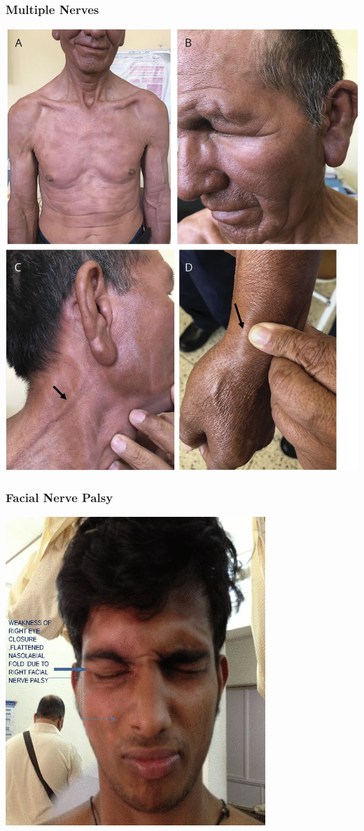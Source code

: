 \documentclass{beamer}
\begin{document}
	\begin{frame}
		\frametitle{Multiple Nerves}
		\centering
		\includegraphics[height=0.8\textheight,keepaspectratio]{hansen's-overall.jpg}
	\end{frame}
       
	\begin{frame}
		\frametitle{Facial Nerve Palsy}
		\centering
		\includegraphics[height=0.8\textheight,keepaspectratio]{facial-palsy.png}
	\end{frame}
\end{document}
